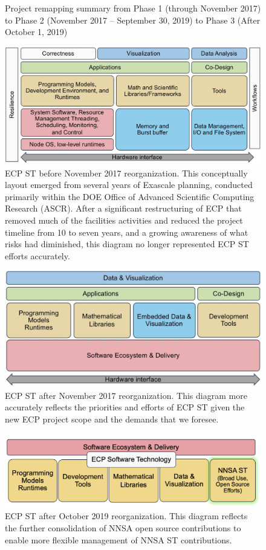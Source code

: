 \begin{figure}
\caption{\label{fig:project-remapping}Project remapping summary from Phase 1 (through November 2017) to Phase 2 (November 2017 -- September 30, 2019) to Phase 3 (After October 1, 2019)}
\end{figure}


\begin{figure}
	\centering
	\includegraphics[width=0.9\linewidth]{ECPSTV1}
	\caption{ECP ST before November 2017 reorganization.  This conceptually layout emerged from several years of Exascale planning, conducted primarily within the DOE Office of Advanced Scientific Computing Research (ASCR).  After a significant restructuring of ECP that removed much of the facilities activities and reduced the project timeline from 10 to seven years, and a growing awareness of what risks had diminished, this diagram no longer represented ECP ST efforts accurately.}
	\label{fig:ecpstv1}
\end{figure}
\begin{figure}
	\centering
	\includegraphics[width=0.9\linewidth]{ECPSTV2}
	\caption{ECP ST after November 2017 reorganization.  This diagram more accurately reflects the priorities and efforts of ECP ST given the new ECP project scope and the demands that we foresee.}
	\label{fig:ecpstv2}
\end{figure}
\begin{figure}
	\centering
	\includegraphics[width=0.9\linewidth]{ECPSTV3}
	\caption{ECP ST after October 2019 reorganization.  This diagram reflects the further consolidation of NNSA open source contributions to enable more flexible management of NNSA ST contributions.}
\end{figure}
